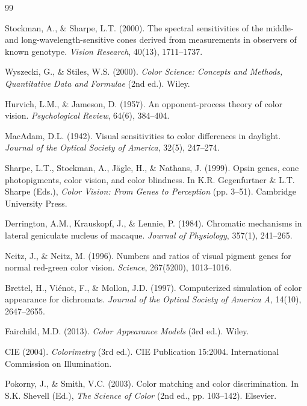 \documentclass[11pt,a4paper]{article}
\begin{document}
\begin{thebibliography}{99}

Stockman, A., \& Sharpe, L.T. (2000). The spectral sensitivities of the middle- and long-wavelength-sensitive cones derived from measurements in observers of known genotype. \textit{Vision Research}, 40(13), 1711--1737.

Wyszecki, G., \& Stiles, W.S. (2000). \textit{Color Science: Concepts and Methods, Quantitative Data and Formulae} (2nd ed.). Wiley.

Hurvich, L.M., \& Jameson, D. (1957). An opponent-process theory of color vision. \textit{Psychological Review}, 64(6), 384--404.

MacAdam, D.L. (1942). Visual sensitivities to color differences in daylight. \textit{Journal of the Optical Society of America}, 32(5), 247--274.

Sharpe, L.T., Stockman, A., J\"agle, H., \& Nathans, J. (1999). Opsin genes, cone photopigments, color vision, and color blindness. In K.R. Gegenfurtner \& L.T. Sharpe (Eds.), \textit{Color Vision: From Genes to Perception} (pp. 3--51). Cambridge University Press.

Derrington, A.M., Krauskopf, J., \& Lennie, P. (1984). Chromatic mechanisms in lateral geniculate nucleus of macaque. \textit{Journal of Physiology}, 357(1), 241--265.

Neitz, J., \& Neitz, M. (1996). Numbers and ratios of visual pigment genes for normal red-green color vision. \textit{Science}, 267(5200), 1013--1016.

Brettel, H., Vi\'enot, F., \& Mollon, J.D. (1997). Computerized simulation of color appearance for dichromats. \textit{Journal of the Optical Society of America A}, 14(10), 2647--2655.

Fairchild, M.D. (2013). \textit{Color Appearance Models} (3rd ed.). Wiley.

CIE (2004). \textit{Colorimetry} (3rd ed.). CIE Publication 15:2004. International Commission on Illumination.

Pokorny, J., \& Smith, V.C. (2003). Color matching and color discrimination. In S.K. Shevell (Ed.), \textit{The Science of Color} (2nd ed., pp. 103--142). Elsevier.


\end{thebibliography}
\end{document}
